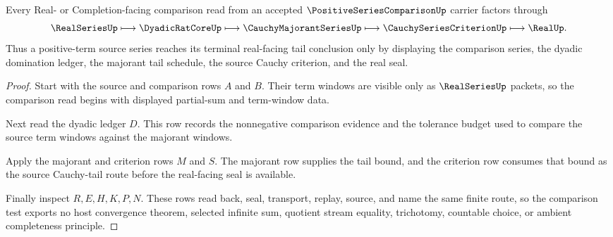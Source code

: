 \begin{theorem}
\label{thm:positive-series-comparison-majorant-route}
Every Real- or Completion-facing comparison read from an accepted $\PositiveSeriesComparisonUp$ carrier factors through
$$
\RealSeriesUp \longmapsto \DyadicRatCoreUp \longmapsto \CauchyMajorantSeriesUp \longmapsto \CauchySeriesCriterionUp \longmapsto \RealUp .
$$
Thus a positive-term source series reaches its terminal real-facing tail conclusion only by displaying the comparison series, the dyadic domination ledger, the majorant tail schedule, the source Cauchy criterion, and the real seal.
\end{theorem}
\begin{proof}
Start with the source and comparison rows $A$ and $B$. Their term windows are visible only as $\RealSeriesUp$ packets, so the comparison read begins with displayed partial-sum and term-window data.

Next read the dyadic ledger $D$. This row records the nonnegative comparison evidence and the tolerance budget used to compare the source term windows against the majorant windows.

Apply the majorant and criterion rows $M$ and $S$. The majorant row supplies the tail bound, and the criterion row consumes that bound as the source Cauchy-tail route before the real-facing seal is available.

Finally inspect $R,E,H,K,P,N$. These rows read back, seal, transport, replay, source, and name the same finite route, so the comparison test exports no host convergence theorem, selected infinite sum, quotient stream equality, trichotomy, countable choice, or ambient completeness principle.
\end{proof}



